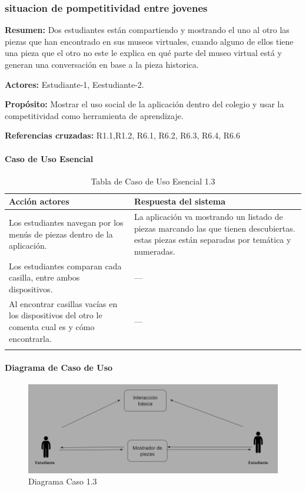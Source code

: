 \subsubsection{situacion de pompetitividad entre jovenes}

{\textbf {Resumen:}}
Dos estudiantes están compartiendo y mostrando el uno al otro las piezas que han encontrado en sus museos virtuales, cuando alguno de ellos tiene una pieza que el otro no este le explica en qué parte del museo virtual está y generan una conversación en base a la pieza historica.

{\textbf {Actores:}}
Estudiante-1, Eestudiante-2.

{\textbf {Propósito:}}
Mostrar el uso social de la aplicación dentro del colegio y usar la competitividad como herramienta de aprendizaje.

{\textbf {Referencias cruzadas:}}
R1.1,R1.2, R6.1, R6.2, R6.3, R6.4, R6.6

\paragraph{Caso de Uso Esencial}

\begin{longtable}{|p{5cm}|p{8cm}|}
\hline 
Acción actores & Respuesta del sistema \\ 
\hline 
Los estudiantes navegan por los menús de piezas dentro de la aplicación. & La aplicación va mostrando un listado de piezas marcando las que tienen descubiertas.
estas piezas están separadas por temática y numeradas.
 \\ 
\hline 
Los estudiantes comparan cada casilla, entre ambos dispositivos. & --- \\
\hline 
Al encontrar casillas vacías en los dispositivos del otro le comenta cual es y cómo encontrarla.  & --- \\
\hline 
\caption{Tabla de Caso de Uso Esencial 1.3}
\label{tab23}
\end{longtable}

\paragraph{Diagrama de Caso de Uso}

\begin{figure}[H]
\centerline{\includegraphics[width=15cm]{imgs/CasoUso_3.PNG}}
\caption{Diagrama Caso 1.3}
\label{fig_3_1}
\end{figure}

